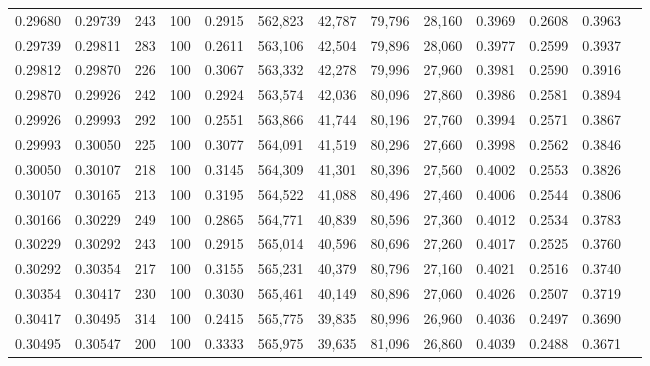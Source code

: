 \begin{tabular}{rrrrrrrrrrrrr}
0.29680 & 0.29739 &   243 & 100 &                                     0.2915 & 562,823 &  42,787 &  79,796 &  28,160 & 0.3969 & 0.2608 & 0.3963 \\
0.29739 & 0.29811 &   283 & 100 &                                     0.2611 & 563,106 &  42,504 &  79,896 &  28,060 & 0.3977 & 0.2599 & 0.3937 \\
0.29812 & 0.29870 &   226 & 100 &                                     0.3067 & 563,332 &  42,278 &  79,996 &  27,960 & 0.3981 & 0.2590 & 0.3916 \\
0.29870 & 0.29926 &   242 & 100 &                                     0.2924 & 563,574 &  42,036 &  80,096 &  27,860 & 0.3986 & 0.2581 & 0.3894 \\
0.29926 & 0.29993 &   292 & 100 &                                     0.2551 & 563,866 &  41,744 &  80,196 &  27,760 & 0.3994 & 0.2571 & 0.3867 \\
0.29993 & 0.30050 &   225 & 100 &                                     0.3077 & 564,091 &  41,519 &  80,296 &  27,660 & 0.3998 & 0.2562 & 0.3846 \\
0.30050 & 0.30107 &   218 & 100 &                                     0.3145 & 564,309 &  41,301 &  80,396 &  27,560 & 0.4002 & 0.2553 & 0.3826 \\
0.30107 & 0.30165 &   213 & 100 &                                     0.3195 & 564,522 &  41,088 &  80,496 &  27,460 & 0.4006 & 0.2544 & 0.3806 \\
0.30166 & 0.30229 &   249 & 100 &                                     0.2865 & 564,771 &  40,839 &  80,596 &  27,360 & 0.4012 & 0.2534 & 0.3783 \\
0.30229 & 0.30292 &   243 & 100 &                                     0.2915 & 565,014 &  40,596 &  80,696 &  27,260 & 0.4017 & 0.2525 & 0.3760 \\
0.30292 & 0.30354 &   217 & 100 &                                     0.3155 & 565,231 &  40,379 &  80,796 &  27,160 & 0.4021 & 0.2516 & 0.3740 \\
0.30354 & 0.30417 &   230 & 100 &                                     0.3030 & 565,461 &  40,149 &  80,896 &  27,060 & 0.4026 & 0.2507 & 0.3719 \\
0.30417 & 0.30495 &   314 & 100 &                                     0.2415 & 565,775 &  39,835 &  80,996 &  26,960 & 0.4036 & 0.2497 & 0.3690 \\
0.30495 & 0.30547 &   200 & 100 &                                     0.3333 & 565,975 &  39,635 &  81,096 &  26,860 & 0.4039 & 0.2488 & 0.3671 \\

\end{tabular}
